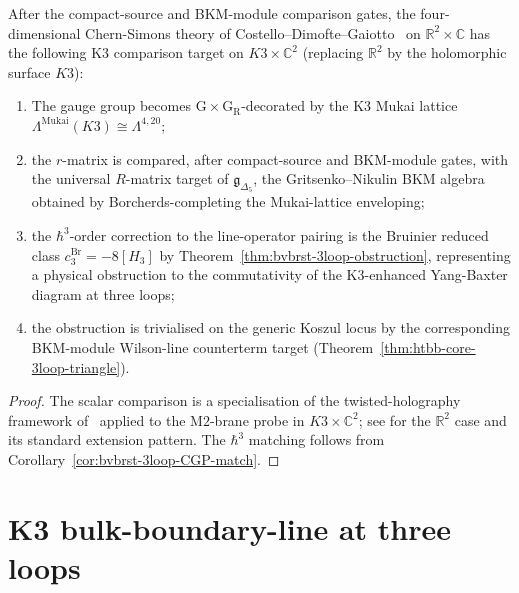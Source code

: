\begin{corollary}
\label{cor:htbb-4d-CS-K3-3loop}
After the compact-source and BKM-module comparison gates, the
four-dimensional Chern-Simons theory of
Costello--Dimofte--Gaiotto~\cite{CostelloDimofteGaiotto2020} on
$\mathbb{R}^2\times\mathbb{C}$ has the following K3 comparison target
on $K3\times\mathbb{C}^2$ (replacing $\mathbb{R}^2$ by the holomorphic
surface $K3$):
\begin{enumerate}[leftmargin=1.8em]
\item The gauge group becomes
 $\mathrm{G}\times\mathrm{G}_{\mathrm{R}}$-decorated by the K3
 Mukai lattice $\Lambda^{\mathrm{Mukai}}(K3)\cong\Lambda^{4,20}$;
\item the $r$-matrix is compared, after compact-source and BKM-module
 gates, with the universal $R$-matrix target of
 $\mathfrak{g}_{\Delta_5}$, the Gritsenko--Nikulin BKM algebra obtained
 by Borcherds-completing the Mukai-lattice enveloping;
\item the $\hbar^3$-order correction to the line-operator pairing
 is the Bruinier reduced class $c^{\mathrm{Br}}_3=-8[H_3]$ by
 Theorem~\ref{thm:bvbrst-3loop-obstruction}, representing a
 physical obstruction to the commutativity of the K3-enhanced
 Yang-Baxter diagram at three loops;
\item the obstruction is trivialised on the generic Koszul locus by the
 corresponding BKM-module Wilson-line counterterm target
 (Theorem~\ref{thm:htbb-core-3loop-triangle}).
\end{enumerate}
\end{corollary}

\begin{proof}
The scalar comparison is a specialisation of the
twisted-holography framework of~\cite{Costello2015omega,CostelloGaiottoPaquette2018}
applied to the M$2$-brane probe in $K3\times\mathbb{C}^2$; see
\cite[Thm.~3.1]{CostelloDimofteGaiotto2020} for the $\mathbb{R}^2$
case and its standard extension pattern. The $\hbar^3$ matching
follows from
Corollary~\ref{cor:bvbrst-3loop-CGP-match}.
\end{proof}

\section{K3 bulk-boundary-line at three loops}
\label{sec:htbb-supplement-ii}

